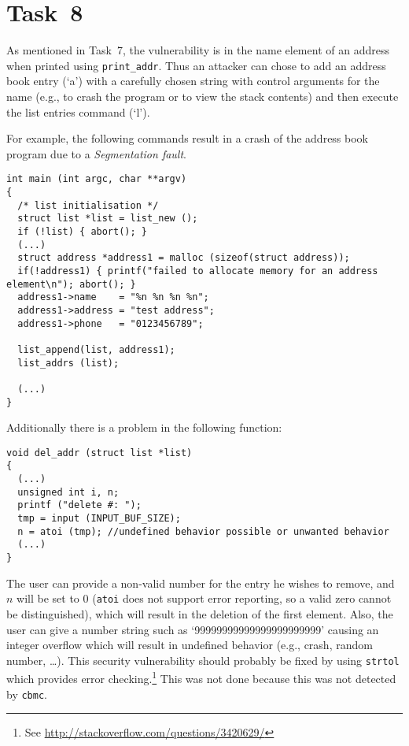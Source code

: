 \section*{Task~8}
As mentioned in Task~7, the vulnerability is in the name element of an address when printed using \texttt{print\_addr}. Thus an attacker can chose to add an address book entry (`a') with a carefully chosen string with control arguments for the name (e.g., to crash the program or to view the stack contents) and then execute the list entries command (`l').

For example, the following commands result in a crash of the address book program due to a \emph{Segmentation fault}.
\begin{lstlisting}
int main (int argc, char **argv)
{
  /* list initialisation */
  struct list *list = list_new ();
  if (!list) { abort(); }
  (...)
  struct address *address1 = malloc (sizeof(struct address));
  if(!address1) { printf("failed to allocate memory for an address element\n"); abort(); }
  address1->name    = "%n %n %n %n";
  address1->address = "test address";
  address1->phone   = "0123456789";
  
  list_append(list, address1);
  list_addrs (list);

  (...)
}
\end{lstlisting}


Additionally there is a problem in the following function:
\begin{lstlisting}
void del_addr (struct list *list)
{
  (...)
  unsigned int i, n;
  printf ("delete #: ");
  tmp = input (INPUT_BUF_SIZE);
  n = atoi (tmp); //undefined behavior possible or unwanted behavior
  (...)
}
\end{lstlisting}
The user can provide a non-valid number for the entry he wishes to remove, and $n$ will be set to 0 (\texttt{atoi} does not support error reporting, so a valid zero cannot be distinguished), which will result in the deletion of the first element. Also, the user can give a number string such as `99999999999999999999999' causing an integer overflow which will result in undefined behavior (e.g., crash, random number, \ldots). This security vulnerability should probably be fixed by using \texttt{strtol} which provides error checking.\footnote{See \url{http://stackoverflow.com/questions/3420629/}} This was not done because this was not detected by \texttt{cbmc}.